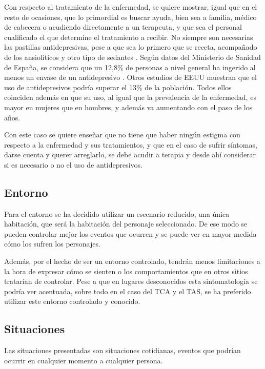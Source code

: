 \documentclass[12pt, a4paper,twoside,titlepage]{book}
\begin{document}
\begin{itemize}
{Con respecto al tratamiento de la enfermedad, se quiere mostrar, igual que en el resto de ocasiones, que lo primordial es buscar ayuda, bien sea a familia, médico de cabecera o acudiendo directamente a un terapeuta, y que sea el personal cualificado el que determine el tratamiento a recibir. No siempre son necesarias las pastillas antidepresivas, pese a que sea lo primero que se receta, acompañado de los ansiolíticos y otro tipo de sedantes \cite{articuloDEP7}. Según datos del Ministerio de Sanidad de España, se considera que un 12,8\% de personas a nivel general ha ingerido al menos un envase de un antidepresivo \cite{articuloDEP8}.  Otros estudios de EEUU muestran que el uso de antidepresivos podría superar el 13\% de la población. Todos ellos coinciden además en que su uso, al igual que la prevalencia de la enfermedad, es mayor en mujeres que en hombres, y además va aumentando con el paso de los años. 

Con este caso se quiere enseñar que no tiene que haber ningún estigma con respecto a la enfermedad y sus tratamientos, y que en el caso de sufrir síntomas, darse cuenta y querer arreglarlo, se debe acudir a terapia y desde ahí considerar si es necesario o no el uso de antidepresivos. 
}
     
\end{itemize}




\subsection{Entorno}
Para el entorno se ha decidido utilizar un escenario reducido, una única habitación, que será la habitación del personaje seleccionado. De ese modo se pueden controlar mejor los eventos que ocurren y se puede ver en mayor medida cómo los sufren los personajes.  

Además, por el hecho de ser un entorno controlado, tendrán menos limitaciones a la hora de expresar cómo se sienten o los comportamientos que en otros sitios tratarían de controlar. Pese a que en lugares desconocidos esta sintomatología se podría ver acentuada, sobre todo en el caso del TCA y el TAS, se ha preferido utilizar este entorno controlado y conocido.  

\subsection{Situaciones}
Las situaciones presentadas son situaciones cotidianas, eventos que podrían ocurrir en cualquier momento a cualquier persona. 
\end{document}

